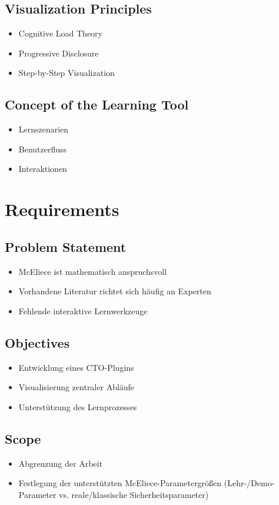 \documentclass[a4paper,11pt]{article}
\begin{document}
\subsection{Visualization Principles}
\begin{itemize}
	\item Cognitive Load Theory
	\item Progressive Disclosure
	\item Step-by-Step Visualization
\end{itemize}

\subsection{Concept of the Learning Tool}
\begin{itemize}
	\item Lernszenarien
	\item Benutzerfluss
	\item Interaktionen
\end{itemize}

\section{Requirements}

\subsection{Problem Statement}
\begin{itemize}
	\item McEliece ist mathematisch anspruchsvoll
	\item Vorhandene Literatur richtet sich häufig an Experten
	\item Fehlende interaktive Lernwerkzeuge
\end{itemize}

\subsection{Objectives}
\begin{itemize}
	\item Entwicklung eines CTO-Plugins
	\item Visualisierung zentraler Abläufe
	\item Unterstützung des Lernprozesses
\end{itemize}

\subsection{Scope}
\begin{itemize}
	\item Abgrenzung der Arbeit
	\item Festlegung der unterstützten McEliece-Parametergrößen
	      (Lehr-/Demo-Parameter vs. reale/klassische Sicherheitsparameter)
\end{itemize}
\end{document}
